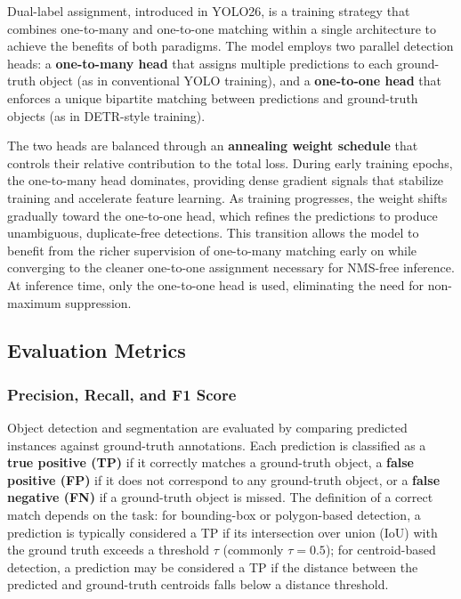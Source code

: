 \label{sec:dual-label}

Dual-label assignment, introduced in YOLO26, is a training strategy that combines one-to-many and one-to-one matching within a single architecture to achieve the benefits of both paradigms. The model employs two parallel detection heads: a \textbf{one-to-many head} that assigns multiple predictions to each ground-truth object (as in conventional YOLO training), and a \textbf{one-to-one head} that enforces a unique bipartite matching between predictions and ground-truth objects (as in DETR-style training).

The two heads are balanced through an \textbf{annealing weight schedule} that controls their relative contribution to the total loss. During early training epochs, the one-to-many head dominates, providing dense gradient signals that stabilize training and accelerate feature learning. As training progresses, the weight shifts gradually toward the one-to-one head, which refines the predictions to produce unambiguous, duplicate-free detections. This transition allows the model to benefit from the richer supervision of one-to-many matching early on while converging to the cleaner one-to-one assignment necessary for NMS-free inference. At inference time, only the one-to-one head is used, eliminating the need for non-maximum suppression.

\subsection{Evaluation Metrics}

\subsubsection{Precision, Recall, and F1 Score}

Object detection and segmentation are evaluated by comparing predicted instances against ground-truth annotations. Each prediction is classified as a \textbf{true positive (TP)} if it correctly matches a ground-truth object, a \textbf{false positive (FP)} if it does not correspond to any ground-truth object, or a \textbf{false negative (FN)} if a ground-truth object is missed. The definition of a correct match depends on the task: for bounding-box or polygon-based detection, a prediction is typically considered a TP if its intersection over union (IoU) with the ground truth exceeds a threshold $\tau$ (commonly $\tau = 0.5$); for centroid-based detection, a prediction may be considered a TP if the distance between the predicted and ground-truth centroids falls below a distance threshold.

